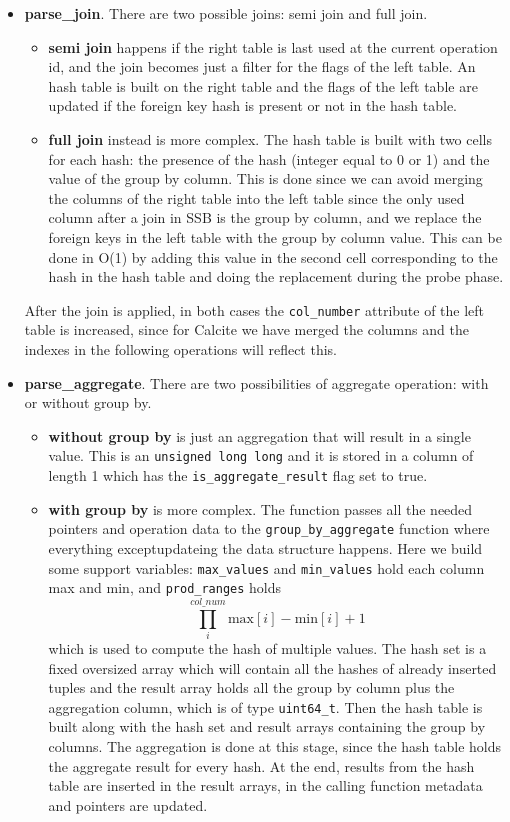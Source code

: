 \documentclass[a4paper, 10pt]{article}
\begin{document}
\begin{itemize}
    \item \textbf{parse\_join}. There are two possible joins: semi join and full join.
          \begin{itemize}
              \item \textbf{semi join} happens if the right table is last used at the current operation id, and the join becomes just a filter for the flags of the left table. An hash table is built on the right table and the flags of the left table are updated if the foreign key hash is present or not in the hash table.
              \item \textbf{full join} instead is more complex. The hash table is built with two cells for each hash: the presence of the hash (integer equal to 0 or 1) and the value of the group by column. This is done since we can avoid merging the columns of the right table into the left table since the only used column after a join in SSB is the group by column, and we replace the foreign keys in the left table with the group by column value. This can be done in O(1) by adding this value in the second cell corresponding to the hash in the hash table and doing the replacement during the probe phase.
          \end{itemize}
          After the join is applied, in both cases the \texttt{col\_number} attribute of the left table is increased, since for Calcite we have merged the columns and the indexes in the following operations will reflect this.
    \item \textbf{parse\_aggregate}. There are two possibilities of aggregate operation: with or without group by.
          \begin{itemize}
              \item \textbf{without group by} is just an aggregation that will result in a single value. This is an \texttt{unsigned long long} and it is stored in a column of length 1 which has the \texttt{is\_aggregate\_result} flag set to true.
              \item \textbf{with group by} is more complex. The function passes all the needed pointers and operation data to the \texttt{group\_by\_aggregate} function where everything exceptupdateing the data structure happens. Here we build some support variables: \texttt{max\_values} and \texttt{min\_values} hold each column max and min, and \texttt{prod\_ranges} holds \[ \prod^{col\_num}_i \mathrm{max}[i] - \mathrm{min}[i] + 1 \] which is used to compute the hash of multiple values. The hash set is a fixed oversized array which will contain all the hashes of already inserted tuples and the result array holds all the group by column plus the aggregation column, which is of type \texttt{uint64\_t}. Then the hash table is built along with the hash set and result arrays containing the group by columns. The aggregation is done at this stage, since the hash table holds the aggregate result for every hash. At the end, results from the hash table are inserted in the result arrays, in the calling function metadata and pointers are updated.
          \end{itemize}
\end{itemize}
\end{document}
